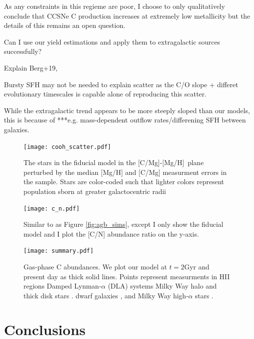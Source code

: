\documentclass[12pt,oneside]{report}
\newcommand{\caah}{[C/Mg]-[Mg/H]}
\begin{document}
As any constraints in this regieme are poor, I choose to only qualitatively
conclude that CCSNe C production increases at extremely low metallicity
but the details of this remains an open question.


Can I use our yield estimations and apply them to extragalactic sources successfully? 

Explain Berg+19,

Bursty SFH may not be needed to explain scatter as the C/O slope + differet evolutionary timescales is capable alone of reproducing this scatter.

While the extragalactic trend appears to be more steeply sloped than our models, this is because of ***e.g. mass-dependent outflow rates/differening SFH between galaxies. 

\begin{figure}
    \centering
    \texttt{[image: cooh\_scatter.pdf]}
    \caption[Scatter agreement]{The stars in the fiducial model in the \caah~plane perturbed by the median [Mg/H] and [C/Mg] measurment errors in the \citet{jack_subgiant} sample. Stars are color-coded such that lighter colors represent population sborn at greater galactocentric radii
    }
\end{figure}

\begin{figure}
    \texttt{[image: c\_n.pdf]}
    \caption{Similar to as Figure \ref{fig:agb_sims}, except I only show the fiducial model and I plot the [C/N] abundance ratio on the y-axis.
    }
\end{figure}

\begin{figure}
\centering
\texttt{[image: summary.pdf]}
\caption[Gas phase abundances]{Gas-phase C abundances. We plot our model at $t=2$Gyr and present day as thick solid lines. Points represent measurments in 
    HII regions    \citep[pink circles;][]{skillman+20, esteban+02, esteban+09, esteban+14, esteban+19}
    Damped Lynman-$\alpha$ (DLA) systems \citep[blue triangles;][]{cooke+17} 
    Milky Way halo and thick disk stars \citep[green stars;][]{nissen+14, fabbian+09}. 
    dwarf galaxies \citep[red diamonds;]{berg+19},
    and Milky Way high-$\alpha$ stars \citet[yellow points;][]{jack_subgiant}.
}
\label{fig:gas_phase}
\end{figure}


\chapter{Conclusions}
\end{document}
